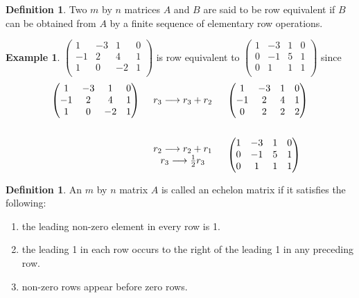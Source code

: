 \documentclass[11pt,a4paper]{article}
\theoremstyle{definition}
\newtheorem{defn}[thm]{Definition}
\newtheorem{exa}[thm]{Example}
\begin{document}
\begin{defn}
Two $m$ by $n$ matrices $A$ and $B$ are said to be row equivalent if $B$ can be obtained from $A$ by a finite sequence of elementary row operations.
\end{defn}
\begin{exa}
$
\begin{pmatrix}
1&-3&1&0\\-1&2&4&1\\1&0&-2&1\\
\end{pmatrix}
$ is row equivalent to $
\begin{pmatrix}
1&-3&1&0\\0&-1&5&1\\0&1&1&1\\
\end{pmatrix}
$ since
\begin{align*}
\begin{pmatrix}
1&-3&1&0\\-1&2&4&1\\1&0&-2&1\\
\end{pmatrix}
&\hspace{0.5cm}
\begin{matrix}
r_3\longrightarrow r_3+r_2\\
\end{matrix}
\hspace{0.5cm}
\begin{pmatrix}
1&-3&1&0\\-1&2&4&1\\0&2&2&2\\
\end{pmatrix}\\\\
&\hspace{0.5cm}
\begin{matrix}
r_2\longrightarrow r_2+r_1\\ r_3\longrightarrow \frac{1}{2}r_3\\
\end{matrix}
\hspace{0.5cm}
\begin{pmatrix}
1&-3&1&0\\0&-1&5&1\\0&1&1&1\\
\end{pmatrix}
\end{align*}
\end{exa}


\begin{defn}
An $m$ by $n$ matrix $A$ is called an echelon matrix if it satisfies the following:
\begin{enumerate}
\item[i.] the leading non-zero element in every row is 1.
\item[ii.] the leading 1 in each row occurs to the right of the leading 1 in any preceding row.
\item[iii.] non-zero rows appear before zero rows.
\end{enumerate}
\end{defn}
\end{document}
